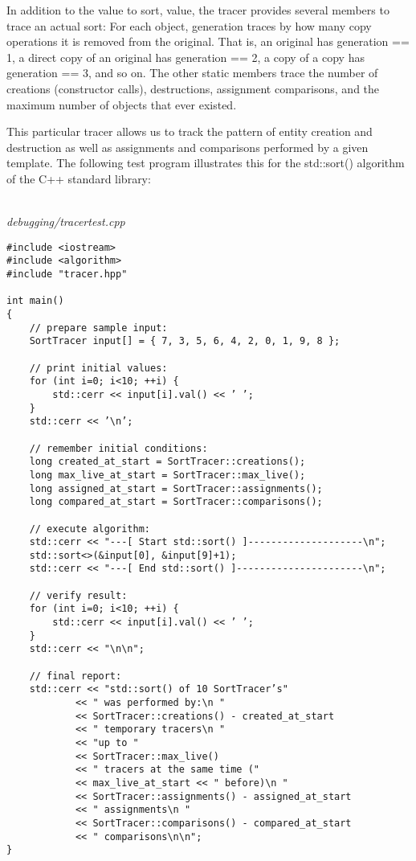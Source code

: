 In addition to the value to sort, value, the tracer provides several members to trace an actual sort: For each object, generation traces by how many copy operations it is removed from the original. That is, an original has generation == 1, a direct copy of an original has generation == 2, a copy of a copy has generation == 3, and so on. The other static members trace the number of creations (constructor calls), destructions, assignment comparisons, and the maximum number of objects that ever existed.

This particular tracer allows us to track the pattern of entity creation and destruction as well as assignments and comparisons performed by a given template. The following test program illustrates this for the std::sort() algorithm of the C++ standard library:

\hspace*{\fill} \\ %
\noindent
\textit{debugging/tracertest.cpp}
\begin{lstlisting}[style=styleCXX]
#include <iostream>
#include <algorithm>
#include "tracer.hpp"

int main()
{
	// prepare sample input:
	SortTracer input[] = { 7, 3, 5, 6, 4, 2, 0, 1, 9, 8 };
	
	// print initial values:
	for (int i=0; i<10; ++i) {
		std::cerr << input[i].val() << ’ ’;
	}
	std::cerr << ’\n’;
	
	// remember initial conditions:
	long created_at_start = SortTracer::creations();
	long max_live_at_start = SortTracer::max_live();
	long assigned_at_start = SortTracer::assignments();
	long compared_at_start = SortTracer::comparisons();
	
	// execute algorithm:
	std::cerr << "---[ Start std::sort() ]--------------------\n";
	std::sort<>(&input[0], &input[9]+1);
	std::cerr << "---[ End std::sort() ]----------------------\n";
	
	// verify result:
	for (int i=0; i<10; ++i) {
		std::cerr << input[i].val() << ’ ’;
	}
	std::cerr << "\n\n";
	
	// final report:
	std::cerr << "std::sort() of 10 SortTracer’s"
			<< " was performed by:\n "
			<< SortTracer::creations() - created_at_start
			<< " temporary tracers\n "
			<< "up to "
			<< SortTracer::max_live()
			<< " tracers at the same time ("
			<< max_live_at_start << " before)\n "
			<< SortTracer::assignments() - assigned_at_start
			<< " assignments\n "
			<< SortTracer::comparisons() - compared_at_start
			<< " comparisons\n\n";
}
\end{lstlisting}

